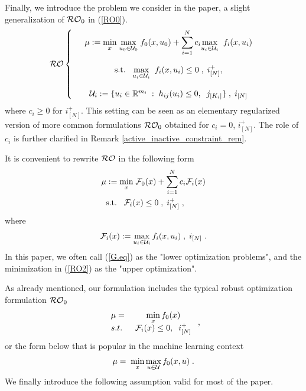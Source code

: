 \documentclass[journal,twoside,web]{ieeecolor}
\begin{document}
Finally, we introduce the problem we consider in the paper, a slight generalization of ${\cal RO}_0$ in (\ref{RO0}).
\begin{equation}{\cal RO}\left\{\begin{array}{ccc}
&\mu:=\underset{x}{\min} \;\underset{u_0\in {\cal U}_0}{\max}\; f_0(x,u_0)+\displaystyle\sum_{i=1}^N c_i \underset{u_i\in {\cal U}_i}{\max}\;\; f_i(x,u_i)\label{RO}\\ \\
&\text{s.t.}\;\;\;\underset{u_i\in {\cal U}_i}{\max}\;\; f_i(x,u_i)\leq 0\;,\;i^+_{[N]},\\ \\
&{\cal U}_i:=\{u_ i\in \mathbb{R}^{m_i}\;:\;h_{ij}(u_i)\leq 0,\;\;j_{[K_i]}\}\;,\;i_{[N]}
\end{array}\right. 
\end{equation}
where $c_i\geq 0$ for $i^+_{[N]}$. This setting can be seen as an elementary regularized version of more common formulations ${\cal RO}_0$ obtained for $c_i=0$, $i_{[N]}^+$. 
The role of $c_i$ is further clarified in Remark \ref{active_inactive_constraint_rem}.

It is convenient to rewrite ${\cal RO}$ in the following form 
\begin{align}
&\mu:=\underset{x}{\min} \; {\cal F}_0(x)+\sum_{i=1}^N c_i{\cal F}_i(x)\label{RO2}\\
&\;\;\text{s.t.}\;\;\;{\cal F}_i(x)\leq 0\;,\;i^+_{[N]}\;,\nonumber
\end{align}
where 
\begin{equation}\label{G.eq}
{\cal F}_i(x):=\max_{u_i\in {\cal U}_i} f_i(x,u_i)\;,\; i_{[N]}\;.
\end{equation}
In this paper, we often call (\ref{G.eq}) as the "lower optimization problems", and the minimization in (\ref{RO2}) as the "upper optimization".

 As already mentioned, our formulation includes the typical robust optimization formulation ${\cal RO}_0$
\begin{equation}
\begin{array}{lcc}
\mu=&\;\displaystyle\min_x f_0(x)\\
s.t.&\; {\cal F}_i(x)\leq 0,\;\;i^+_{[N]}
\end{array}\;,
\label{RO3}
\end{equation}
or the form below that is popular in the machine learning context \cite{rafique2022,zhang2021}
\begin{equation}
\mu=\;\displaystyle\min_x\max_{u\in {\cal U}} f_0(x,u)\;.
\end{equation}
We finally introduce the following assumption valid for most of the paper. 
\end{document}
